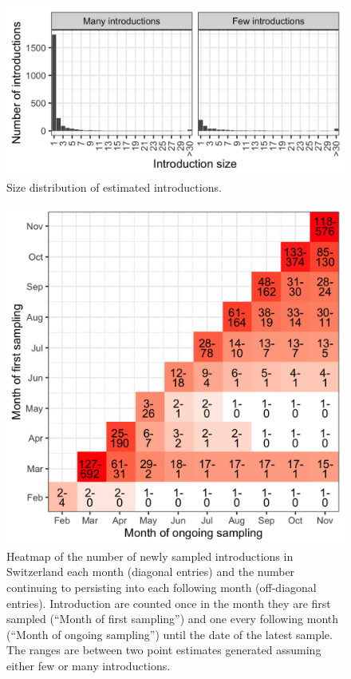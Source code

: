 \documentclass[9pt,twoside,lineno]{pnas-new}
\begin{document}
\begin{figure}[H]
\centering
\includegraphics[width = 0.5\linewidth]{figures/chain_size_dist.png}
\caption{Size distribution of estimated introductions.}  
\label{fig:chain_size_dist}
\end{figure}

\begin{figure}[H]
\centering
\includegraphics[width = 0.5\linewidth]{figures/chain_longevity_matrix.png}
\caption{Heatmap of the number of newly sampled introductions in Switzerland each month (diagonal entries) and the number continuing to persisting into each following month (off-diagonal entries). Introduction are counted once in the month they are first sampled (``Month of first sampling'') and one every following month (``Month of ongoing sampling'') until the date of the latest sample. The ranges are between two point estimates generated assuming either few or many introductions.}  
\label{fig:chain-longevity-matrix}
\end{figure}
\end{document}
